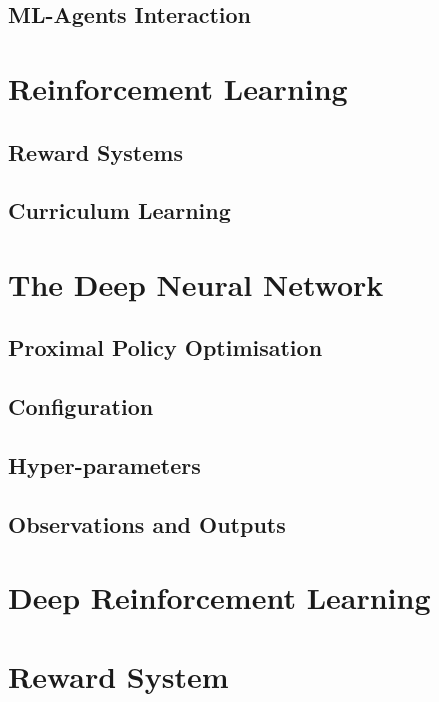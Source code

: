 \documentclass{article}
\begin{document}
\subsection{ML-Agents Interaction}
\lipsum[2][1]

\section{Reinforcement Learning}
\lipsum[2][1]

\subsection{Reward Systems}
\lipsum[2][1]

\subsection{Curriculum Learning}
\lipsum[2][1]

\section{The Deep Neural Network}
\lipsum[2][1]

\subsection{Proximal Policy Optimisation}
\lipsum[2][1]

\subsection{Configuration}
\lipsum[2][1]

\subsection{Hyper-parameters}
\lipsum[2][1]

\subsection{Observations and Outputs}
\lipsum[2][1]

\section{Deep Reinforcement Learning}
\lipsum[2][1]

\section{Reward System}
\lipsum[2][1]
\end{document}
